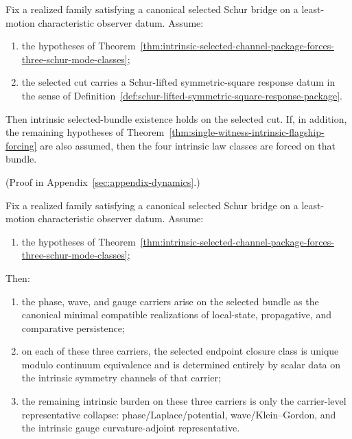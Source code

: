 \begin{corollary}
\label{cor:orthogonal-schur-lifted-symmetric-response-closes-mode-gap}
Fix a realized family satisfying a canonical selected Schur bridge on a
least-motion characteristic observer datum. Assume:
\begin{enumerate}[label=(\roman*), leftmargin=2em, itemsep=0.2em]
\item the hypotheses of
      Theorem~\ref{thm:intrinsic-selected-channel-package-forces-three-schur-mode-classes};
\item the selected cut carries a Schur-lifted symmetric-square response
      datum in the sense of
      Definition~\ref{def:schur-lifted-symmetric-square-response-package}.
\end{enumerate}
Then intrinsic selected-bundle existence holds on the selected cut. If, in
addition, the remaining hypotheses of
Theorem~\ref{thm:single-witness-intrinsic-flagship-forcing} are also assumed,
then the four intrinsic law classes are forced on that bundle.
\end{corollary}

(Proof in Appendix~\ref{sec:appendix-dynamics}.)

\begin{theorem}
\label{thm:first-three-intrinsic-law-classes-already-forced}
Fix a realized family satisfying a canonical selected Schur bridge on a
least-motion characteristic observer datum. Assume:
\begin{enumerate}[label=(\roman*), leftmargin=2em, itemsep=0.2em]
\item the hypotheses of
      Theorem~\ref{thm:intrinsic-selected-channel-package-forces-three-schur-mode-classes};
\end{enumerate}
Then:
\begin{enumerate}[label=(\alph*), leftmargin=2em, itemsep=0.2em]
\item the phase, wave, and gauge carriers arise on the selected bundle as the
      canonical minimal compatible realizations of local-state,
      propagative, and comparative persistence;
\item on each of these three carriers, the selected endpoint closure class is
      unique modulo continuum equivalence and is determined entirely by scalar
      data on the intrinsic symmetry channels of that carrier;
\item the remaining intrinsic burden on these three carriers is only the
      carrier-level representative collapse:
      phase/Laplace/potential, wave/Klein--Gordon, and
      the intrinsic gauge curvature-adjoint representative.
\end{enumerate}
\end{theorem}

